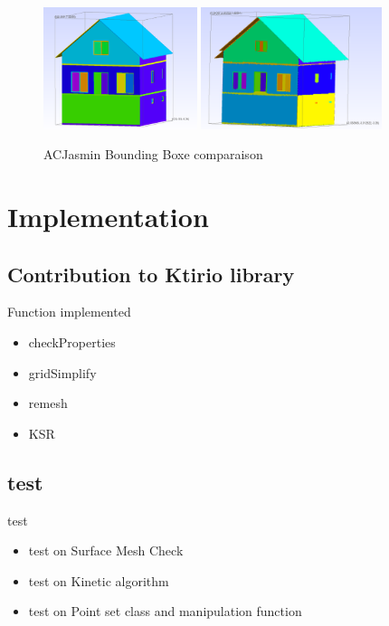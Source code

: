 \documentclass[10pt]{beamer}
\begin{document}
\begin{frame}
    
    \begin{figure}
    \includegraphics[width=0.4\textwidth]{../image/ACJasmin_input_bounding_box.png}
    \includegraphics[width=0.47\textwidth]{../image/ACjasmin_output_bounding_box.png}
    \caption{ACJasmin Bounding Boxe comparaison}
    \end{figure}
    
\end{frame}

\section{Implementation}
\subsection{Contribution to Ktirio library}
\begin{frame}{Function implemented}
   \begin{itemize}
    \item checkProperties{}
    \item gridSimplify{}
    \item remesh{}
    \item  KSR{}
   \end{itemize}

\end{frame}

\subsection{test}
\begin{frame}{test}
    \begin{itemize}
        \item test on Surface Mesh Check
        \item test on Kinetic algorithm
        \item test on Point set class and manipulation function
    \end{itemize}
\end{frame}
\end{document}

